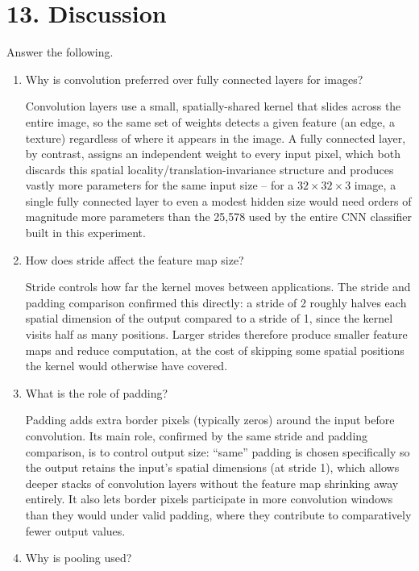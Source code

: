 \documentclass[11pt]{article}
\begin{document}
\section*{13. Discussion}

Answer the following.

\begin{enumerate}
\item Why is convolution preferred over fully connected layers for images?

Convolution layers use a small, spatially-shared kernel that slides across the entire image, so the same set of weights detects a given feature (an edge, a texture) regardless of where it appears in the image. A fully connected layer, by contrast, assigns an independent weight to every input pixel, which both discards this spatial locality/translation-invariance structure and produces vastly more parameters for the same input size -- for a $32\times32\times3$ image, a single fully connected layer to even a modest hidden size would need orders of magnitude more parameters than the 25,578 used by the entire CNN classifier built in this experiment.

\item How does stride affect the feature map size?

Stride controls how far the kernel moves between applications. The stride and padding comparison confirmed this directly: a stride of 2 roughly halves each spatial dimension of the output compared to a stride of 1, since the kernel visits half as many positions. Larger strides therefore produce smaller feature maps and reduce computation, at the cost of skipping some spatial positions the kernel would otherwise have covered.

\item What is the role of padding?

Padding adds extra border pixels (typically zeros) around the input before convolution. Its main role, confirmed by the same stride and padding comparison, is to control output size: ``same'' padding is chosen specifically so the output retains the input's spatial dimensions (at stride 1), which allows deeper stacks of convolution layers without the feature map shrinking away entirely. It also lets border pixels participate in more convolution windows than they would under valid padding, where they contribute to comparatively fewer output values.

\item Why is pooling used?


\end{enumerate}
\end{document}
